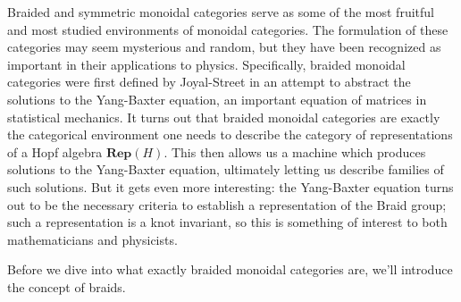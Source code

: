 Braided and symmetric monoidal categories serve as some of the most fruitful and 
most studied environments of monoidal categories. The formulation of these categories 
may seem mysterious and random, but they have been recognized as important 
in their applications to physics. Specifically, braided monoidal categories were 
first defined by Joyal-Street in an attempt to abstract the solutions to the 
Yang-Baxter equation, an important equation of matrices in statistical mechanics. 
It turns out that braided monoidal categories are exactly the categorical environment 
one needs to describe the category of representations of a Hopf algebra $\textbf{Rep}(H)$. 
This then allows us a machine which produces solutions to the Yang-Baxter equation, ultimately 
letting us describe families of such solutions. But it gets even more interesting: 
the Yang-Baxter equation turns out to be the necessary criteria to establish a representation 
of the Braid group; such a representation is a knot invariant, so this is something of interest 
to both mathematicians and physicists. 

Before we dive into what exactly braided monoidal categories are, we'll introduce 
the concept of braids. 

